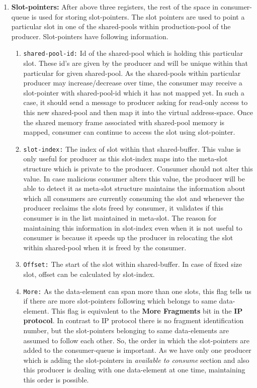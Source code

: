 \documentclass[a4paper,twoside]{report} %
\begin{document}
\begin{enumerate}
  \item \textbf{Slot-pointers:} After above three registers, the rest
  of the space in consumer-queue is used for storing slot-pointers.
  The slot pointers are used to point a particular slot in one of the
  shared-pools within production-pool of the producer.  
  Slot-pointers have following information.
  \begin{enumerate}
    \item \texttt{shared-pool-id:} Id of the shared-pool which is
    holding this particular slot.  These id's are given by the
    producer and will be unique within that particular for given
    shared-pool.  As the shared-pools within particular
    producer may increase/decrease over time, the consumer may receive
    a slot-pointer with shared-pool-id which it has not mapped yet.
    In such a case, it should send a message to producer asking for
    read-only access to this new shared-pool and then map it into
    the virtual address-space.  Once the shared memory frame
    associated with shared-pool memory is mapped, consumer can 
    continue to access the slot using slot-pointer.
    \item \texttt{slot-index:}  The index of slot within that
    shared-buffer.  This value is only useful for producer as this
    slot-index maps into the meta-slot structure which is private to
    the producer.  Consumer should not alter this value.  In case
    malicious consumer alters this value, the producer will be able
    to detect it as meta-slot structure maintains the information
    about which all consumers are currently consuming the slot and
    whenever the producer reclaims the slots freed by consumer, it
    validates if this consumer is in the list maintained in meta-slot.
    The reason for maintaining this information in slot-index even
    when it is not useful to consumer is because it speeds up the
    producer in relocating the slot within shared-pool when it is
    freed by the consumer.  
    \item \texttt{Offset:} The start of the slot within shared-buffer.
    In case of fixed size slot, offset can be calculated by
    slot-index.
    \item \texttt{More:} As the data-element can span more than one
    slots, this flag tells us if there are more slot-pointers 
    following which belongs to same data-element.  This flag is
    equivalent to the \textbf{More Fragments} bit in the \textbf{IP
    protocol}.  In contrast to IP protocol there is no fragment
    identification number, but the slot-pointers belonging to same
    data-elements are assumed to follow each other.  So, the order in
    which the slot-pointers are added to the consumer-queue is
    important.  As we have only one producer which is adding the
    slot-pointers in \textit{available to consume} section and also
    this producer is dealing with one data-element at one time,
    maintaining this order is possible.
  \end{enumerate} 

\end{enumerate} 
\end{document}
